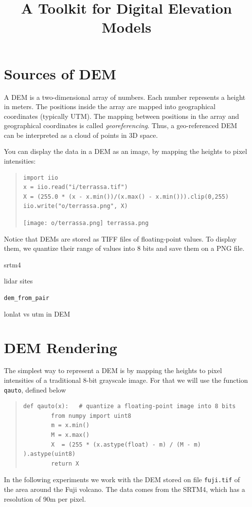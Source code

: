 \title{A Toolkit for Digital Elevation Models}

\section{Sources of DEM}


A DEM is a two-dimensional array of numbers.  Each number
represents a height in meters.  The positions inside the array are mapped into
geographical coordinates (typically UTM).  The mapping between positions in
the array and geographical coordinates is called \emph{georeferencing}.
Thus, a geo-referenced DEM can be interpreted as a cloud of points in 3D
space.

You can display the data in a DEM as an image, by mapping the heights to
pixel intensities:

\begin{quote}
\begin{verbatim}
import iio
x = iio.read("i/terrassa.tif")
X = (255.0 * (x - x.min())/(x.max() - x.min())).clip(0,255)
iio.write("o/terrassa.png", X)
\end{verbatim}
\texttt{[image: o/terrassa.png]}~\verb+terrassa.png+
\end{quote}

Notice that DEMs are stored as TIFF files of floating-point values.  To
display them, we quantize their range of values into 8 bits and save them on
a PNG file.




srtm4

lidar sites


\verb+dem_from_pair+

lonlat vs utm in DEM


\clearpage
\section{DEM Rendering}


The simplest way to represent a DEM is by mapping the heights to pixel
intensities of a traditional 8-bit grayscale image.
For that we will use the function \verb+qauto+, defined below
\begin{quote}
\begin{verbatim}
def qauto(x):   # quantize a floating-point image into 8 bits
        from numpy import uint8
        m = x.min()
        M = x.max()
        X  = (255 * (x.astype(float) - m) / (M - m) ).astype(uint8)
        return X
\end{verbatim}
\end{quote}
In the following experiments we work with the DEM stored on file
\verb+fuji.tif+ of the area around the Fuji volcano.  The data comes from
the SRTM4, which has a resolution of 90m per pixel.

